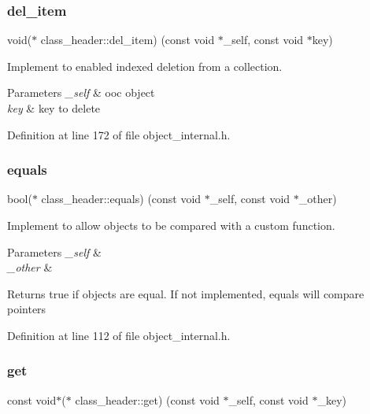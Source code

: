 \subsubsection{\texorpdfstring{del\+\_\+item}{del\_item}}
{\footnotesize\ttfamily void($\ast$ class\+\_\+header\+::del\+\_\+item) (const void $\ast$\+\_\+self, const void $\ast$key)}

Implement to enabled indexed deletion from a collection. 
\begin{DoxyParams}{Parameters}
{\em \+\_\+self} & ooc object \\
\hline
{\em key} & key to delete \\
\hline
\end{DoxyParams}


Definition at line 172 of file object\+\_\+internal.\+h.

\mbox{\label{structclass__header_a01dc6aae9011475ec7be8500d4f63c5b}} 
\subsubsection{\texorpdfstring{equals}{equals}}
{\footnotesize\ttfamily bool($\ast$ class\+\_\+header\+::equals) (const void $\ast$\+\_\+self, const void $\ast$\+\_\+other)}

Implement to allow objects to be compared with a custom function. 
\begin{DoxyParams}{Parameters}
{\em \+\_\+self} & \\
\hline
{\em \+\_\+other} & \\
\hline
\end{DoxyParams}
\begin{DoxyReturn}{Returns}
true if objects are equal. If not implemented, equals will compare pointers 
\end{DoxyReturn}


Definition at line 112 of file object\+\_\+internal.\+h.

\mbox{\label{structclass__header_ab2de24bb8c5d3b1b5e74a69bb6c307b2}} 
\subsubsection{\texorpdfstring{get}{get}}
{\footnotesize\ttfamily const void$\ast$($\ast$ class\+\_\+header\+::get) (const void $\ast$\+\_\+self, const void $\ast$\+\_\+key)}

